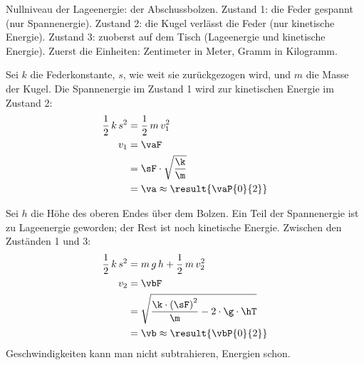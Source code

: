Nullniveau der Lageenergie: der Abschussbolzen. Zustand 1: die Feder gespannt (nur Spannenergie). Zustand 2: die Kugel verlässt die Feder (nur kinetische Energie). Zustand 3: zuoberst auf dem Tisch (Lageenergie und kinetische Energie). Zuerst die Einheiten: Zentimeter in Meter, Gramm in Kilogramm.

\begin{abcliste}
\abc
Sei $k$ die Federkonstante, $s$, wie weit sie zurückgezogen wird, und $m$ die Masse der Kugel. Die Spannenergie im Zustand 1 wird zur kinetischen Energie im Zustand 2:
\begin{align}
 \frac{1}{2}\,k\,s^2 &= \frac{1}{2}\,m\,v_1^2 \\
 v_1 &= \vaF \\
   &= \sF\cdot\sqrt{\frac{\k}{\m}} \\
   &= \va \approx \result{\vaP{0}{2}}
\end{align}

\abc
Sei $h$ die Höhe des oberen Endes über dem Bolzen. Ein Teil der Spannenergie ist zu Lageenergie geworden; der Rest ist noch kinetische Energie. Zwischen den Zuständen 1 und 3:
\begin{align}
 \frac{1}{2}\,k\,s^2 &= m\,g\,h + \frac{1}{2}\,m\,v_2^2 \\
 v_2 &= \vbF \\
   &= \sqrt{\frac{\k\cdot\left(\sF\right)^2}{\m}-2\cdot\g\cdot\hT} \\
   &= \vb \approx \result{\vbP{0}{2}}
\end{align}
Geschwindigkeiten kann man nicht subtrahieren, Energien schon.
\end{abcliste}

